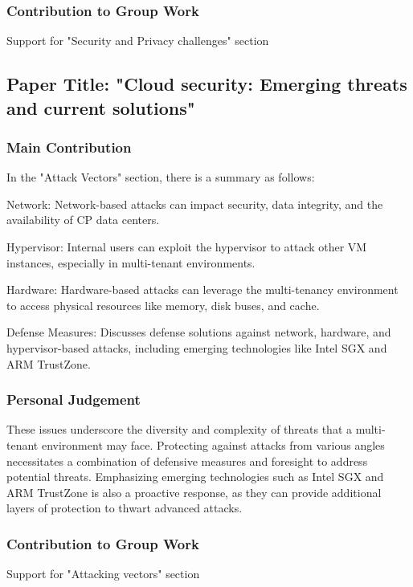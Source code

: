 \documentclass[12pt, twoside]{article}
\begin{document}
\subsubsection{Contribution to Group Work}


Support for "Security and Privacy challenges" section

\subsection{Paper Title: "Cloud security: Emerging threats and current solutions" \cite{coppolino2017cloud}}
\subsubsection{Main Contribution}

In the "Attack Vectors" section, there is a summary as follows:

Network: Network-based attacks can impact security, data integrity, and the availability of CP data centers.

Hypervisor: Internal users can exploit the hypervisor to attack other VM instances, especially in multi-tenant environments.

Hardware: Hardware-based attacks can leverage the multi-tenancy environment to access physical resources like memory, disk buses, and cache.

Defense Measures: Discusses defense solutions against network, hardware, and hypervisor-based attacks, including emerging technologies like Intel SGX and ARM TrustZone.



\subsubsection{Personal Judgement}

These issues underscore the diversity and complexity of threats that a multi-tenant environment may face. Protecting against attacks from various angles necessitates a combination of defensive measures and foresight to address potential threats. Emphasizing emerging technologies such as Intel SGX and ARM TrustZone is also a proactive response, as they can provide additional layers of protection to thwart advanced attacks.


\subsubsection{Contribution to Group Work}


Support for "Attacking vectors" section

\renewcommand{\refname}{References}


\end{document}
